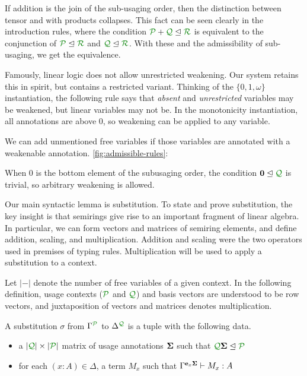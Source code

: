 If addition is the join of the sub-usaging order, then the distinction
between tensor and with products collapses.
This fact can be seen clearly in the introduction rules, where the condition
$\resctx P + \resctx Q \subres \resctx R$ is equivalent to the conjunction of
$\resctx P \subres \resctx R$ and $\resctx Q \subres \resctx R$.
With these and the admissibility of sub-usaging, we get the equivalence.

Famously, linear logic does not allow unrestricted weakening.
Our system retains this in spirit, but contains a restricted variant.
Thinking of the $\{0,1,\omega\}$ instantiation, the following rule says that
\emph{absent} and \emph{unrestricted} variables may be weakened, but linear
variables may not be.
In the monotonicity instantiation, all annotations are above $0$, so weakening
can be applied to any variable.

\begin{lemma}[Weakening]
  \label{lem:weak}
  We can add unmentioned free variables if those variables are annotated with a
  weakenable annotation.
  \autoref{fig:admissible-rules}: 
\end{lemma}

When $0$ is the bottom element of the subusaging order, the condition $\vct 0
\subres \resctx Q$ is trivial, so arbitrary weakening is allowed.

Our main syntactic lemma is substitution.
To state and prove substitution, the key insight is that semirings give rise to
an important fragment of linear algebra.
In particular, we can form vectors and matrices of semiring elements, and define
addition, scaling, and multiplication.
Addition and scaling were the two operators used in premises of typing rules.
Multiplication will be used to apply a substitution to a context.


Let $|-|$ denote the number of free variables of a given context.
In the following definition, usage contexts ($\resctx P$ and $\resctx Q$) and
basis vectors are understood to be row vectors, and juxtaposition of vectors and
matrices denotes multiplication.

\begin{definition}
  A substitution $\sigma$ from $\Gamma^{\resctx P}$ to
  $\Delta^{\resctx Q}$ is a tuple with the following data.

  \begin{itemize}
  \item a $|\resctx Q| \times |\resctx P|$ matrix of usage annotations $\mathbf{\Sigma}$ such that $\resctx Q \mat \Sigma \subres \resctx P$
  \item for each $(x:A) \in \Delta$, a term $M_x$ such that
    $\Gamma^{\mathbf{e}_x \mathbf{\Sigma}} \vdash M_x : A$
  \end{itemize}
\end{definition}

